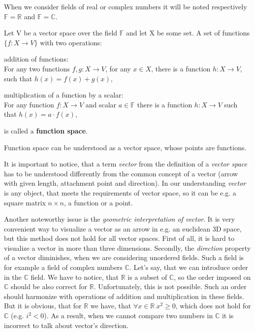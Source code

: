 \begin{remark}
When we consider fields of real or complex numbers it will be noted respectively $\mathbb{F} = \mathbb{R}$ and $\mathbb{F} = \mathbb{C}$.
\end{remark}

\begin{definition}
Let V be a vector space over the field $\mathbb{F}$ and let X be some set. A set of functions $\{f: X \rightarrow V\}$ with two operations:
\begin{legal}
    \item addition of functions: \\ 
    For any two functions $f, g: X \rightarrow V$, for any $x \in X$, there is a function $h: X \rightarrow V$, such that $h(x) = f(x) + g(x)$,
    \item multiplication of a function by a scalar: \\
    For any function $f: X \rightarrow V$ and scalar $a \in \mathbb{F}$ there is a function $h: X \rightarrow V$ such that $h(x) = a \cdot f(x)$,
\end{legal}
is called a \textbf{function space}.
\end{definition}

\begin{remark}
Function space can be understood as a vector space, whose points are functions.
\end{remark}

It is important to notice, that a term \textit{vector} from the definition of a \textit{vector space} has to be understood differently from the common concept of a vector (arrow with given length, attachment point and direction). In our understanding \textit{vector} is any object, that meets the requirements of vector space, so it can be e.g. a square matrix $n \times n$, a function or a point.

Another noteworthy issue is the \textit{geometric interpretation of vector}. It is very convenient way to visualize a vector as an arrow in e.g. an euclidean 3D space, but this method does not hold for all vector spaces. First of all, it is hard to visualize a vector in more than three dimensions. Secondly, the \textit{direction} property of a vector diminishes, when we are considering unordered fields. Such a field is for example a field of complex numbers $\mathbb{C}$. Let's say, that we can introduce order in the $\mathbb{C}$ field. We have to notice, that $\mathbb{R}$ is a subset of $\mathbb{C}$, so the order imposed on $\mathbb{C}$ should be also correct for $\mathbb{R}$. Unfortunately, this is not possible. Such an order should harmonize with operations of addition and multiplication in these fields. But it is obvious, that for $\mathbb{R}$ we have, that $\forall x \in \mathbb{R}\  x^2 \geq 0$, which does not hold for $\mathbb{C}$ (e.g. $i^2 < 0$). As a result, when we cannot compare two numbers in $\mathbb{C}$ it is incorrect to talk about vector's direction.

